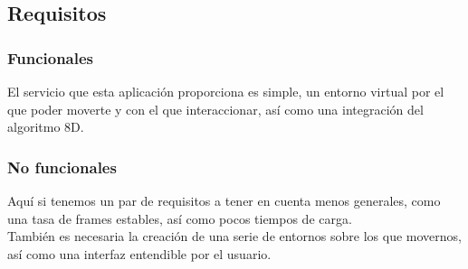 \subsection{Requisitos}
\subsubsection{Funcionales}

\quad El servicio que esta aplicación proporciona es simple, un entorno virtual por el que poder moverte y con el que interaccionar, así como una integración del algoritmo 8D.\\

\subsubsection{No funcionales}

\quad Aquí si tenemos un par de requisitos a tener en cuenta menos generales, como una tasa de frames estables, así como pocos tiempos de carga.\\

\quad También es necesaria la creación de una serie de entornos sobre los que movernos, así como una interfaz entendible por el usuario.\\

\newpage
